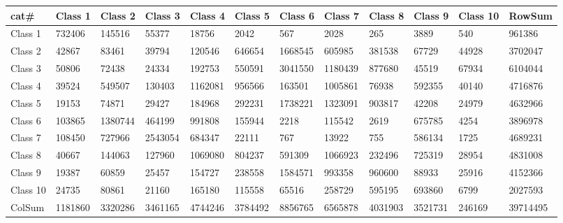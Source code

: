 ﻿\begin{table}[!ht]
    \centering
    \begin{tabular}{|l|l|l|l|l|l|l|l|l|l|l|l|}
    \hline
        cat\# & Class 1 & Class 2 & Class 3 & Class 4 & Class 5 & Class 6 & Class 7 & Class 8 & Class 9 & Class 10 & RowSum \\ \hline
        Class 1 & 732406 & 145516 & 55377 & 18756 & 2042 & 567 & 2028 & 265 & 3889 & 540 & 961386 \\ \hline
        Class 2 & 42867 & 83461 & 39794 & 120546 & 646654 & 1668545 & 605985 & 381538 & 67729 & 44928 & 3702047 \\ \hline
        Class 3 & 50806 & 72438 & 24334 & 192753 & 550591 & 3041550 & 1180439 & 877680 & 45519 & 67934 & 6104044 \\ \hline
        Class 4 & 39524 & 549507 & 130403 & 1162081 & 956566 & 163501 & 1005861 & 76938 & 592355 & 40140 & 4716876 \\ \hline
        Class 5 & 19153 & 74871 & 29427 & 184968 & 292231 & 1738221 & 1323091 & 903817 & 42208 & 24979 & 4632966 \\ \hline
        Class 6 & 103865 & 1380744 & 464199 & 991808 & 155944 & 2218 & 115542 & 2619 & 675785 & 4254 & 3896978 \\ \hline
        Class 7 & 108450 & 727966 & 2543054 & 684347 & 22111 & 767 & 13922 & 755 & 586134 & 1725 & 4689231 \\ \hline
        Class 8 & 40667 & 144063 & 127960 & 1069080 & 804237 & 591309 & 1066923 & 232496 & 725319 & 28954 & 4831008 \\ \hline
        Class 9 & 19387 & 60859 & 25457 & 154727 & 238558 & 1584571 & 993358 & 960600 & 88933 & 25916 & 4152366 \\ \hline
        Class 10 & 24735 & 80861 & 21160 & 165180 & 115558 & 65516 & 258729 & 595195 & 693860 & 6799 & 2027593 \\ \hline
        ColSum & 1181860 & 3320286 & 3461165 & 4744246 & 3784492 & 8856765 & 6565878 & 4031903 & 3521731 & 246169 & 39714495 \\ \hline
    \end{tabular}
\end{table}